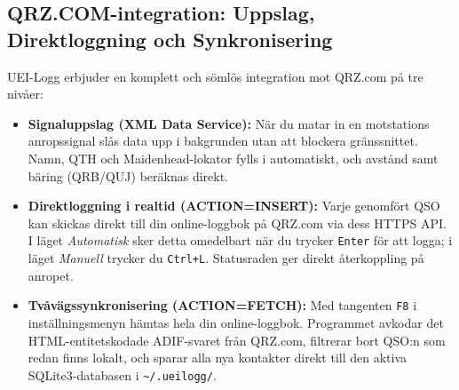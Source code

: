 \documentclass[11pt,a4paper]{article}
\begin{document}
\subsection{QRZ.COM-integration: Uppslag, Direktloggning och Synkronisering}
\label{sec:qrz_integration}
UEI-Logg erbjuder en komplett och sömlös integration mot QRZ.com på tre nivåer:
\begin{itemize}
    \item \textbf{Signaluppslag (XML Data Service):} När du matar in en motstations anropssignal slås data upp i bakgrunden utan att blockera gränssnittet. Namn, QTH och Maidenhead-lokator fylls i automatiskt, och avstånd samt bäring (QRB/QUJ) beräknas direkt.
    \item \textbf{Direktloggning i realtid (ACTION=INSERT):} Varje genomfört QSO kan skickas direkt till din online-loggbok på QRZ.com via dess HTTPS API. I läget \emph{Automatisk} sker detta omedelbart när du trycker \texttt{Enter} för att logga; i läget \emph{Manuell} trycker du \texttt{Ctrl+L}. Statusraden ger direkt återkoppling på anropet.
    \item \textbf{Tvåvägssynkronisering (ACTION=FETCH):} Med tangenten \texttt{F8} i inställningsmenyn hämtas hela din online-loggbok. Programmet avkodar det HTML-entitetskodade ADIF-svaret från QRZ.com, filtrerar bort QSO:n som redan finns lokalt, och sparar alla nya kontakter direkt till den aktiva SQLite3-databasen i \texttt{\textasciitilde/.ueilogg/}.
\end{itemize}
\end{document}

